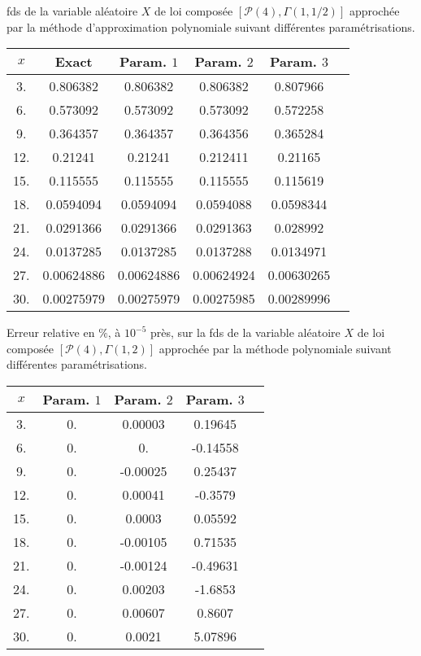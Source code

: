 \begin{tableth}
		\caption[Approximations de la \gls{fds} d'une loi $\left(\mathcal{P}(4),\Gamma(1,4)\right)$ par la méthode d'approximation polynomiale]{\gls{fds} de la variable aléatoire $X$ de loi composée $\left[\mathcal{P}(4),\Gamma(1,1/2)\right]$ approchée par la méthode d'approximation polynomiale suivant différentes paramétrisations.}
			\label{TableSurvivalPolynomialPoissonExponential}
		\begin{tabular}{|c||c|c|c|c|c|}
\hline
$x$ &Exact &Param. $1$ & Param. $2$ & Param. $3$ \\
\hline
\hline
 3. & 0.806382 & 0.806382 & 0.806382 & 0.807966 \\
 6. & 0.573092 & 0.573092 & 0.573092 & 0.572258 \\
 9. & 0.364357 & 0.364357 & 0.364356 & 0.365284 \\
 12. & 0.21241 & 0.21241 & 0.212411 & 0.21165 \\
 15. & 0.115555 & 0.115555 & 0.115555 & 0.115619 \\
 18. & 0.0594094 & 0.0594094 & 0.0594088 & 0.0598344 \\
 21. & 0.0291366 & 0.0291366 & 0.0291363 & 0.028992 \\
 24. & 0.0137285 & 0.0137285 & 0.0137288 & 0.0134971 \\
 27. & 0.00624886 & 0.00624886 & 0.00624924 & 0.00630265 \\
 30. & 0.00275979 & 0.00275979 & 0.00275985 & 0.00289996 \\
\hline
		\end{tabular}
	\end{tableth}

\begin{tableth}
		\caption[Erreur relative ($\%$) sur la \gls{fds} d'une loi $\left(\mathcal{P}(4),\Gamma(1,2)\right)$ associée à la méthode d'approximation polynomiale]{Erreur relative en $\%$, à $10^{-5}$ près, sur la \gls{fds} de la variable aléatoire $X$ de loi composée $\left[\mathcal{P}(4),\Gamma(1,2)\right]$ approchée par la méthode polynomiale suivant différentes paramétrisations.}
			\label{TableRelativeErrorSurvivalPolynomialCompoundPoissonExponential}
		\begin{tabular}{|c||c|c|c|c|}
\hline
$x$ & Param. $1$ & Param. $2$ & Param. $3$ \\
\hline
\hline
 3. & 0. & 0.00003 & 0.19645 \\
 6. & 0. & 0. & -0.14558 \\
 9. & 0. & -0.00025 & 0.25437 \\
 12. & 0. & 0.00041 & -0.3579 \\
 15. & 0. & 0.0003 & 0.05592 \\
 18. & 0. & -0.00105 & 0.71535 \\
 21. & 0. & -0.00124 & -0.49631 \\
 24. & 0. & 0.00203 & -1.6853 \\
 27. & 0. & 0.00607 & 0.8607 \\
 30. & 0. & 0.0021 & 5.07896 \\
\hline
		\end{tabular}
	\end{tableth}

